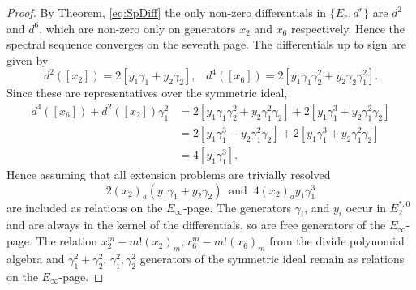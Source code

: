 \documentclass{article}
\theoremstyle{plain}
\theoremstyle{definition}
\numberwithin{thm}{section}
\begin{document}
\begin{proof}
			By Theorem, \ref{eq:SpDiff} the only non-zero differentials in $\{ E_r,d^r \}$ are $d^2$ and $d^6$,
			which are non-zero only on generators $x_2$ and $x_6$ respectively.
			Hence the spectral sequence converges on the seventh page. 
			The differentials up to sign are given by
			\begin{equation}\label{eq:Sp(2)diff}
				d^2([x_2])=2[y_1\gamma_1+y_2\gamma_2], \;\;\;
				d^4([x_6])=2[y_1\gamma_1\gamma_2^2+y_2\gamma_2\gamma_1^2].
			\end{equation}
			Since these are representatives over the symmetric ideal,
			\begin{align}\label{eq:x6Non-trival}
				d^4([x_6])+d^2([x_2])\gamma_1^2 \nonumber
				&=2[y_1\gamma_1\gamma_2^2+y_2\gamma_1^2\gamma_2]+2[y_1\gamma_1^3+y_2\gamma_1^2\gamma_2] \\
				&=2[y_1\gamma_1^3-y_2\gamma_1^2\gamma_2]+2[y_1\gamma_1^3+y_2\gamma_1^2\gamma_2] \nonumber \\
				&=4[y_1\gamma_1^3].
			\end{align} 
			Hence assuming that all extension problems are trivially resolved
			\begin{equation*} 
				2(x_2)_a(y_1\gamma_1+y_2\gamma_2) \;\; \text{and} \;\; 4(x_2)_ay_1\gamma_1^3
			\end{equation*}
			are included as relations on the $E_\infty$-page.
			The generators $\gamma_i$, and $y_i$ occur in $E_2^{*,0}$ and are always in the kernel of the differentials,
			so are free generators of the $E_\infty$-page. 
			The relation $x_2^m-m!(x_2)_m, x_6^m-m!(x_6)_m$ from the divide polynomial algebra
			and $\gamma_1^2+\gamma_2^2$, $\gamma_1^2,\gamma_2^2$ generators of the symmetric ideal
			remain as relations on the $E_\infty$-page. 
			

\end{proof}
\end{document}
